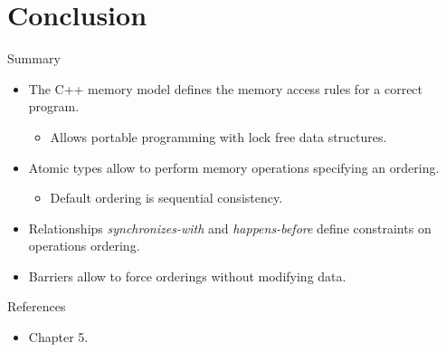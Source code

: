\section{Conclusion}

\begin{frame}[t]{Summary}
\begin{itemize}
  \item The C++ memory model defines the memory access rules for a correct program.
    \begin{itemize}
      \item Allows portable programming with lock free data structures.
    \end{itemize}
  \item Atomic types allow to perform memory operations specifying an ordering.
    \begin{itemize}
      \item Default ordering is sequential consistency.
    \end{itemize}
  \item Relationships \emph{synchronizes-with} and \emph{happens-before} define constraints on operations ordering.
  \item Barriers allow to force orderings without modifying data.
\end{itemize}
\end{frame}

\begin{frame}[t]{References}
\begin{itemize}
  \item \bibwilliams
  Chapter 5.
  
\end{itemize}
\end{frame}
